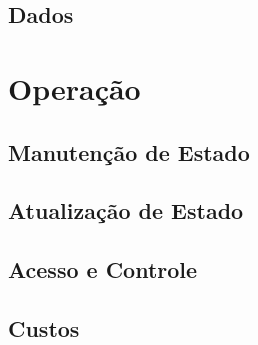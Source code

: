 \documentclass[12pt, a4paper]{report}
\begin{document}
\section{Dados}

\chapter{Operação}

\section{Manutenção de Estado}
\section{Atualização de Estado}
\section{Acesso e Controle}
\section{Custos}
\end{document}
